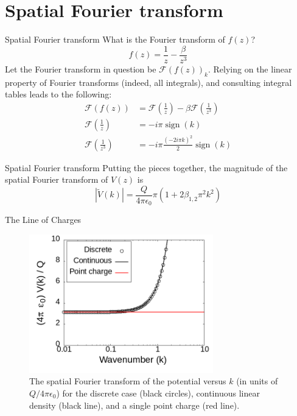 \documentclass{beamer}
\DeclareMathOperator{\sign}{sign}
\begin{document}
\section{Spatial Fourier transform}

\begin{frame}{Spatial Fourier transform}
What is the Fourier transform of $f(z)$?
\begin{equation}
f(z) = \frac{1}{z} - \frac{\beta}{z^3}
\end{equation}
Let the Fourier transform in question be $\mathcal{F}(f(z))_k$.  Relying on the linear property of Fourier transforms (indeed, all integrals), and consulting integral tables leads to the following:
\begin{align}
\mathcal{F}(f(z)) &= \mathcal{F}\left(\frac{1}{z}\right) - \beta \mathcal{F}\left(\frac{1}{z^3}\right) \\
\mathcal{F}\left(\frac{1}{z}\right) &= -i\pi \sign(k) \\
\mathcal{F}\left(\frac{1}{z^3}\right) &= -i\pi \frac{(-2i\pi k)^2}{2} \sign(k)
\end{align}
\end{frame}

\begin{frame}{Spatial Fourier transform}
Putting the pieces together, the magnitude of the spatial Fourier transform of $V(z)$ is
\begin{equation}
\boxed{
|\widetilde{V}(k)| = \frac{Q}{4\pi \epsilon_0} \pi \left( 1 + 2 \beta_{1,2} \pi^2 k^2 \right)
}
\end{equation}
\end{frame}

\begin{frame}{The Line of Charges}
\begin{figure}
\centering
\includegraphics[width=8cm]{figures/line_of_charges2.png}
\caption{\label{fig:line2} The spatial Fourier transform of the potential versus $k$ (in units of $Q/4\pi\epsilon_0$) for the discrete case (black circles), continuous linear density (black line), and a single point charge (red line).}
\end{figure}
\end{frame}
\end{document}
